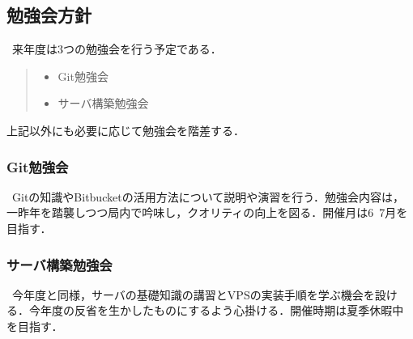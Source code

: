 \subsection*{勉強会方針}


\ 来年度は3つの勉強会を行う予定である．
\begin{quote}
 \begin{itemize}
\item Git勉強会
\item サーバ構築勉強会
 \end{itemize}
\end{quote}
上記以外にも必要に応じて勉強会を階差する．

\subsubsection*{Git勉強会}
\ Gitの知識やBitbucketの活用方法について説明や演習を行う．勉強会内容は，一昨年を踏襲しつつ局内で吟味し，クオリティの向上を図る．開催月は6~7月を目指す．
\subsubsection*{サーバ構築勉強会}
\ 今年度と同様，サーバの基礎知識の講習とVPSの実装手順を学ぶ機会を設ける．今年度の反省を生かしたものにするよう心掛ける．開催時期は夏季休暇中を目指す．


